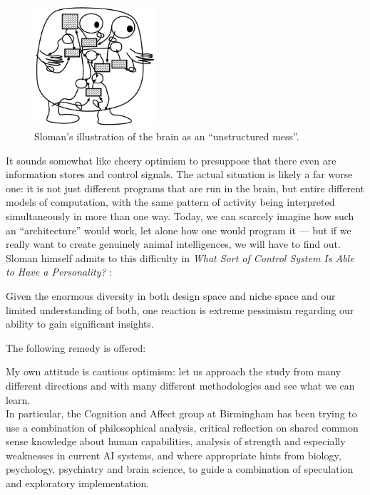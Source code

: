 \begin{figure}[t]
	\centering
	\includegraphics[width=0.4\textwidth]{Figs/slomanBrain.png}
	\caption{Sloman's illustration of the brain as an ``unstructured mess''.}
	\label{fig:slomanBrain}
\end{figure}
It sounds somewhat like cheery optimism to presuppose that there even are information stores and control signals. The actual situation is likely a far worse one: it is not just different programs that are run in the brain, but entire different models of computation, with the same pattern of activity being interpreted simultaneously in more than one way.
Today, we can scarcely imagine how such an ``architecture'' would work, let alone how one would program it --- but if we really want to create genuinely animal intelligences, we will have to find out. Sloman himself admits to this difficulty in {\em What Sort of Control System Is Able to Have a Personality?} \cite[p.\ 6, Section 9 ``Is the task too hard?'']{sloman1997}:
\begin{emquote}
Given the enormous diversity in both design space and niche space and our limited understanding of both, one reaction is extreme pessimism regarding our ability to gain significant insights.
\end{emquote}
The following remedy is offered:
\begin{emquote}
My own attitude is cautious optimism: let us approach the study from many different directions and with many different methodologies and see what we can learn. \ellipses\\
In particular, the Cognition and Affect group at Birmingham has been trying to use a combination of philosophical analysis, critical reflection on shared common sense knowledge about human capabilities, analysis of strength and especially weaknesses in current AI systems, and where appropriate hints from biology, psychology, psychiatry and brain science, to guide a combination of speculation and exploratory implementation. \ellipses
\end{emquote}

